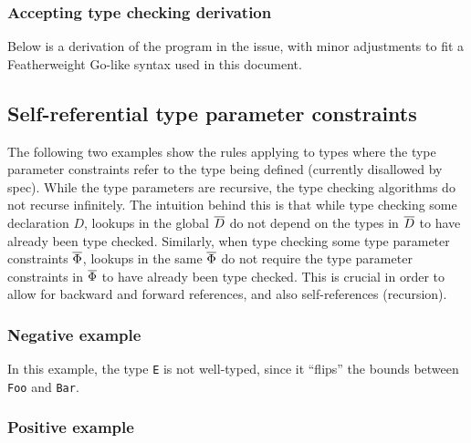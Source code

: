 \documentclass[12pt]{article}
\begin{document}
\subsubsection{Accepting type checking derivation}


\noindent
Below is a derivation of the program in the issue, with minor adjustments to
fit a Featherweight Go-like syntax used in this document.



\subsection{Self-referential type parameter constraints}

The following two examples show the rules applying to types where the type
parameter constraints refer to the type being defined (currently disallowed by
spec). While the type parameters are recursive, the type checking algorithms do
not recurse infinitely. The intuition behind this is that while type checking
some declaration $D$, lookups in the global $\overline{D}$ do not depend on the types
in $\overline{D}$ to have already been type checked. Similarly, when type checking
some type parameter constraints $\overline{\Phi}$, lookups in the same $\overline{\Phi}$ do
not require the type parameter constraints in $\overline{\Phi}$ to have already been
type checked. This is crucial in order to allow for backward and forward
references, and also self-references (recursion).

\subsubsection{Negative example}

In this example, the type \texttt{E} is not well-typed, since it ``flips'' the
bounds between \texttt{Foo} and \texttt{Bar}.





\subsubsection{Positive example}

\end{document}
